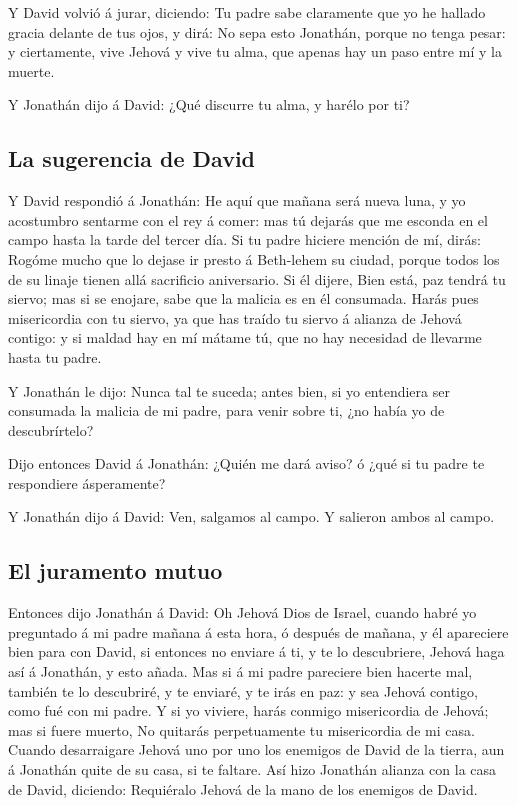  Y David volvió á jurar, diciendo: Tu padre sabe claramente
que yo he hallado gracia delante de tus ojos, y dirá: No sepa esto
Jonathán, porque no tenga pesar: y ciertamente, vive Jehová y vive tu
alma, que apenas hay un paso entre mí y la muerte.

 Y Jonathán dijo á David: ¿Qué discurre tu alma, y harélo
por ti?

\hypertarget{la-sugerencia-de-david}{%
\subsection{La sugerencia de David}\label{la-sugerencia-de-david}}

 Y David respondió á Jonathán: He aquí que mañana será nueva
luna, y yo acostumbro sentarme con el rey á comer: mas tú dejarás que me
esconda en el campo hasta la tarde del tercer día.  Si tu
padre hiciere mención de mí, dirás: Rogóme mucho que lo dejase ir presto
á Beth-lehem su ciudad, porque todos los de su linaje tienen allá
sacrificio aniversario.  Si él dijere, Bien está, paz tendrá
tu siervo; mas si se enojare, sabe que la malicia es en él consumada.
 Harás pues misericordia con tu siervo, ya que has traído tu
siervo á alianza de Jehová contigo: y si maldad hay en mí mátame tú, que
no hay necesidad de llevarme hasta tu padre.

 Y Jonathán le dijo: Nunca tal te suceda; antes bien, si yo
entendiera ser consumada la malicia de mi padre, para venir sobre ti,
¿no había yo de descubrírtelo?

 Dijo entonces David á Jonathán: ¿Quién me dará aviso? ó
¿qué si tu padre te respondiere ásperamente?

 Y Jonathán dijo á David: Ven, salgamos al campo. Y
salieron ambos al campo.

\hypertarget{el-juramento-mutuo}{%
\subsection{El juramento mutuo}\label{el-juramento-mutuo}}

 Entonces dijo Jonathán á David: Oh Jehová Dios de Israel,
cuando habré yo preguntado á mi padre mañana á esta hora, ó después de
mañana, y él apareciere bien para con David, si entonces no enviare á
ti, y te lo descubriere,  Jehová haga así á Jonathán, y
esto añada. Mas si á mi padre pareciere bien hacerte mal, también te lo
descubriré, y te enviaré, y te irás en paz: y sea Jehová contigo, como
fué con mi padre.  Y si yo viviere, harás conmigo
misericordia de Jehová; mas si fuere muerto,  No quitarás
perpetuamente tu misericordia de mi casa. Cuando desarraigare Jehová uno
por uno los enemigos de David de la tierra, aun á Jonathán quite de su
casa, si te faltare.  Así hizo Jonathán alianza con la casa
de David, diciendo: Requiéralo Jehová de la mano de los enemigos de
David.

